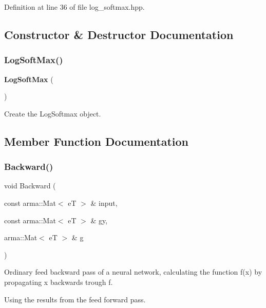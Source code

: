Definition at line 36 of file log\+\_\+softmax.\+hpp.



\subsection{Constructor \& Destructor Documentation}
\mbox{\label{classmlpack_1_1ann_1_1LogSoftMax_a1298935d4b0e2a0751dc55081c9515bf}} 
\subsubsection{Log\+Soft\+Max()}
{\footnotesize\ttfamily \textbf{ Log\+Soft\+Max} (\begin{DoxyParamCaption}{ }\end{DoxyParamCaption})}



Create the Log\+Softmax object. 



\subsection{Member Function Documentation}
\mbox{\label{classmlpack_1_1ann_1_1LogSoftMax_a78dbad83871f43db1975e45a9a69c376}} 
\subsubsection{Backward()}
{\footnotesize\ttfamily void Backward (\begin{DoxyParamCaption}\item[{const arma\+::\+Mat$<$ eT $>$ \&}]{input,  }\item[{const arma\+::\+Mat$<$ eT $>$ \&}]{gy,  }\item[{arma\+::\+Mat$<$ eT $>$ \&}]{g }\end{DoxyParamCaption})}



Ordinary feed backward pass of a neural network, calculating the function f(x) by propagating x backwards trough f. 

Using the results from the feed forward pass.


